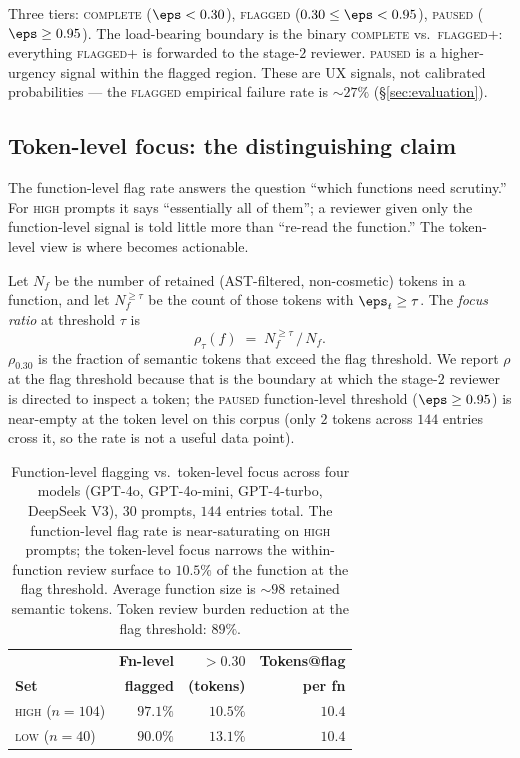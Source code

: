 Three tiers: \textsc{complete} ($\eps < 0.30$), \textsc{flagged}
($0.30 \le \eps < 0.95$), \textsc{paused} ($\eps \ge 0.95$). The
load-bearing boundary is the binary \textsc{complete} vs.\
\textsc{flagged+}: everything \textsc{flagged+} is forwarded to the
stage-$2$ reviewer. \textsc{paused} is a higher-urgency signal
within the flagged region. These are UX signals, not
calibrated probabilities --- the \textsc{flagged} empirical failure
rate is $\sim 27\%$ (\S\ref{sec:evaluation}).

\subsection{Token-level focus: the distinguishing claim}
\label{subsec:token-focus}

The function-level flag rate answers the question ``which functions
need scrutiny.'' For \textsc{high} prompts it says ``essentially all
of them''; a reviewer given only the function-level signal is told
little more than ``re-read the function.'' The token-level view is
where \eps becomes actionable.

Let $N_f$ be the number of retained (AST-filtered, non-cosmetic)
tokens in a function, and let $N_f^{\ge\tau}$ be the count of those
tokens with $\eps_t \ge \tau$. The \emph{focus ratio} at threshold
$\tau$ is
\begin{equation}
  \rho_\tau(f) \;=\; N_f^{\ge\tau} \,/\, N_f.
  \label{eq:focus}
\end{equation}
$\rho_{0.30}$ is the fraction of semantic tokens that exceed the
flag threshold. We report $\rho$ at the flag threshold because that
is the boundary at which the stage-$2$ reviewer is directed to
inspect a token; the \textsc{paused} function-level threshold
($\eps \ge 0.95$) is near-empty at the token level on this corpus
(only $2$ tokens across $144$ entries cross it, so the rate is not
a useful data point).

\begin{table}[h]
\centering
\small
\begin{tabular}{lrrr}
\toprule
 & \textbf{Fn-level} & \textbf{\eps $>0.30$}
   & \textbf{Tokens@flag} \\
\textbf{Set}
 & \textbf{flagged} & \textbf{(tokens)}
 & \textbf{per fn} \\
\midrule
\textsc{high} ($n=104$) & $97.1\%$ & $10.5\%$ & $10.4$ \\
\textsc{low} ($n=40$)   & $90.0\%$ & $13.1\%$ & $10.4$ \\
\bottomrule
\end{tabular}
\caption{Function-level flagging vs.\ token-level focus across four
models (GPT-4o, GPT-4o-mini, GPT-4-turbo, DeepSeek V3), 30 prompts,
$144$ entries total. The function-level flag rate is near-saturating
on \textsc{high} prompts; the token-level focus narrows the
within-function review surface to $10.5\%$ of the function at the
flag threshold. Average function size is $\sim 98$ retained semantic
tokens. Token review burden reduction at the flag threshold: $89\%$.}
\label{tab:token-focus}
\end{table}

